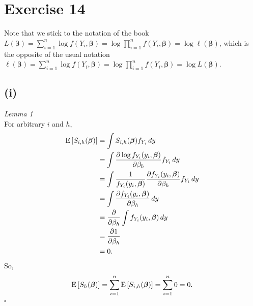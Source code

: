 \section*{Exercise 14}
Note that we stick to the notation of the book
$L(\bm{\beta}) = \sum_{i=1}^{n} \log f(Y_{i},\bm{\beta}) = \log \prod_{i=1}^{n} f(Y_{i},\bm{\beta}) =  \log \ell(\bm{\beta})$, which is the opposite of the usual notation $\ell(\bm{\beta}) = \sum_{i=1}^{n} \log f(Y_{i},\bm{\beta}) = \log \prod_{i=1}^{n} f(Y_{i},\bm{\beta}) =  \log L(\bm{\beta})$.

\subsection*{(i)}
\textit{Lemma 1}\\
For arbitrary $i$ and $h$,
\begin{align*}
\mathrm{E}\left[S_{i,h}(\bm{\beta})\right] &= \int S_{i,h}(\bm{\beta}) f_{Y_{i}} \,dy\\
&= \int \frac{\partial \log f_{Y_{i}}(y_{i},\bm{\beta})}{\partial \beta_{h}} f_{Y_{i}} \,dy\\
&= \int \frac{1}{f_{Y_{i}}(y_{i},\bm{\beta})}\frac{\partial f_{Y_{i}}(y_{i},\bm{\beta})}{\partial \beta_{h}} f_{Y_{i}} \,dy\\
&= \int \frac{\partial f_{Y_{i}}(y_{i},\bm{\beta})}{\partial \beta_{h}} \,dy\\
&= \frac{\partial}{\partial \beta_{h}} \int f_{Y_{i}}(y_{i},\bm{\beta}) \,dy\\
&= \frac{\partial 1}{\partial \beta_{h}}\\
&= 0.
\end{align*}
So,
\begin{align*}
\mathrm{E}\left[S_{h}(\bm{\beta})\right] = \sum_{i=1}^{n}\mathrm{E}\left[S_{i,h}(\bm{\beta})\right] = \sum_{i=1}^{n} 0 = 0.
\end{align*}
\hfill\ensuremath{\square}\\

